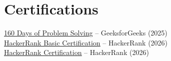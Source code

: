 \documentclass[letterpaper,11pt]{article}
\begin{document}
\section{Certifications}
  \begin{itemize}[leftmargin=0.0in, label={}]
    \small{\item{
      \href{https://media.geeksforgeeks.org/courses/certificates/22a599fc4a5676f802aa4a2ee4cc3c7f.pdf}{\underline{160 Days of Problem Solving}} -- GeeksforGeeks (2025) \\ \vspace{2pt}
      \href{https://www.hackerrank.com/certificates/227251652361}{\underline{HackerRank Basic Certification}} -- HackerRank (2026) \\ \vspace{2pt}
      \href{https://www.hackerrank.com/certificates/9fe36f33fe64}{\underline{HackerRank Certification}} -- HackerRank (2026)
    }}
  \end{itemize}
\end{document}
